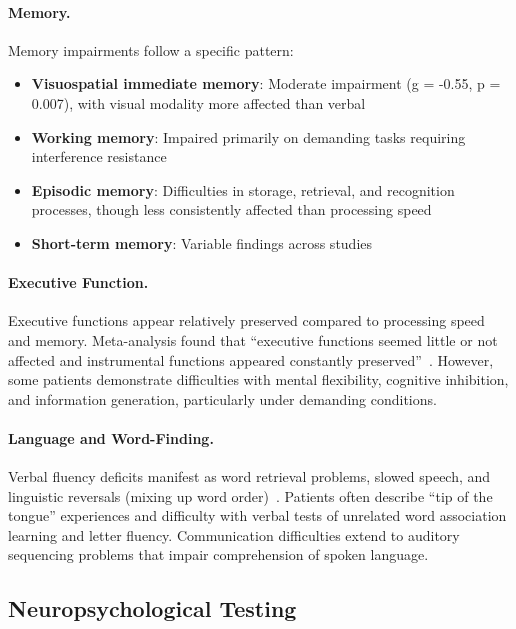 \paragraph{Memory.}
Memory impairments follow a specific pattern:
\begin{itemize}
    \item \textbf{Visuospatial immediate memory}: Moderate impairment (g = -0.55, p = 0.007), with visual modality more affected than verbal~\cite{Cvejic2022cognitive}
    \item \textbf{Working memory}: Impaired primarily on demanding tasks requiring interference resistance
    \item \textbf{Episodic memory}: Difficulties in storage, retrieval, and recognition processes, though less consistently affected than processing speed
    \item \textbf{Short-term memory}: Variable findings across studies
\end{itemize}

\paragraph{Executive Function.}
Executive functions appear relatively preserved compared to processing speed and memory. Meta-analysis found that ``executive functions seemed little or not affected and instrumental functions appeared constantly preserved''~\cite{Cvejic2022cognitive}. However, some patients demonstrate difficulties with mental flexibility, cognitive inhibition, and information generation, particularly under demanding conditions.

\paragraph{Language and Word-Finding.}
Verbal fluency deficits manifest as word retrieval problems, slowed speech, and linguistic reversals (mixing up word order)~\cite{MCAM2024cognitive}. Patients often describe ``tip of the tongue'' experiences and difficulty with verbal tests of unrelated word association learning and letter fluency. Communication difficulties extend to auditory sequencing problems that impair comprehension of spoken language.

\subsection{Neuropsychological Testing}
\label{subsec:neuropsych-testing}

